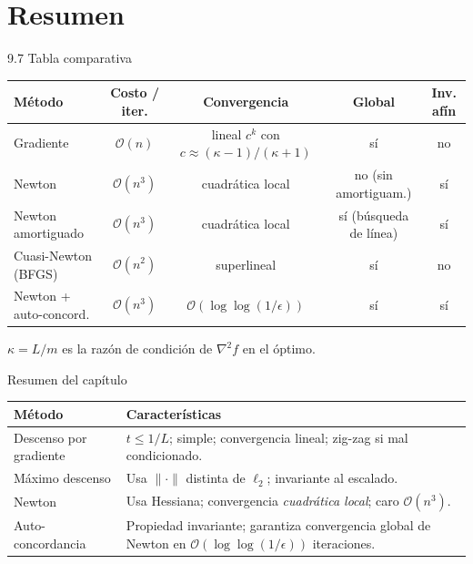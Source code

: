 \documentclass[10pt,aspectratio=169]{beamer}
\begin{document}
\section{Resumen}
\begin{frame}{9.7 Tabla comparativa}
  \begin{center}
    \renewcommand{\arraystretch}{1.3}
    \begin{tabular}{@{}lcccc@{}}
      \toprule
      \textbf{Método} & \textbf{Costo / iter.} & \textbf{Convergencia} & \textbf{Global} & \textbf{Inv. afín} \\
      \midrule
      Gradiente
        & $\mathcal{O}(n)$
        & lineal $c^{k}$ con $c\!\approx\!({\kappa-1})/({\kappa+1})$
        & sí
        & no \\
      Newton
        & $\mathcal{O}(n^{3})$
        & cuadrática local
        & no (sin amortiguam.)
        & sí \\
      Newton amortiguado
        & $\mathcal{O}(n^{3})$
        & cuadrática local
        & sí (búsqueda de línea)
        & sí \\
      Cuasi-Newton (BFGS)
        & $\mathcal{O}(n^{2})$
        & superlineal
        & sí
        & no \\
      Newton + auto-concord.
        & $\mathcal{O}(n^{3})$
        & $\mathcal{O}(\log\log(1/\epsilon))$
        & sí
        & sí \\
      \bottomrule
    \end{tabular}
  \end{center}
  \begin{center}\scriptsize
    $\kappa = L/m$ es la razón de condición de $\nabla^{2} f$ en el óptimo.
  \end{center}
\end{frame}

\begin{frame}{Resumen del capítulo}
  \begin{center}
    \begin{tabular}{@{}lp{6.5cm}@{}}
      \toprule
      \textbf{Método} & \textbf{Características} \\
      \midrule
      Descenso por gradiente
        & $t \le 1/L$; simple; convergencia lineal; zig-zag si mal condicionado. \\
      Máximo descenso
        & Usa $\|\cdot\|$ distinta de $\ell_{2}$; invariante al escalado. \\
      Newton
        & Usa Hessiana; convergencia \emph{cuadrática local}; caro $\mathcal{O}(n^{3})$. \\
      Auto-concordancia
        & Propiedad invariante; garantiza convergencia global de Newton
          en $\mathcal{O}(\log\log(1/\epsilon))$ iteraciones. \\
      \bottomrule
    \end{tabular}
  \end{center}
\end{frame}
\end{document}

